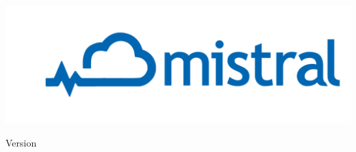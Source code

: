 \includegraphics[width=17cm,height=4.581cm]{images/mistral_logo.png}

\begin{center}\Large{Version \ellexusVersion}\end{center}

\clearpage
